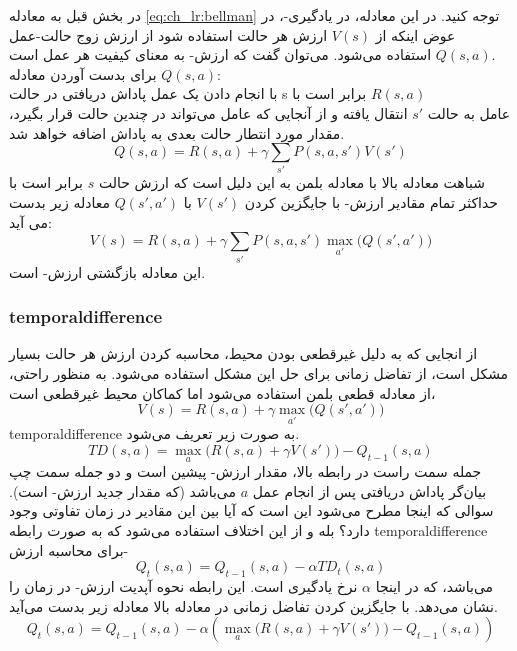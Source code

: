 در بخش قبل به معادله \ref{eq:ch_lr:bellman} توجه کنید. در این معادله، در یادگیری-، در عوض اینکه از $V(s)$ ارزش هر حالت استفاده شود از ارزش زوج حالت-عمل $Q(s,a)$ استفاده می‌شود. می‌توان گفت که ارزش-  به معنای کیفیت هر عمل است. 
\\
برای بدست آوردن معادله $Q(s,a)$:\\
با انجام دادن یک عمل پاداش دریافتی در حالت s برابر است با $R(s,a)$\\
عامل به حالت $s'$ انتقال یافته و از آنجایی که عامل می‌تواند در چندین حالت قرار بگیرد، مقدار مورد انتطار حالت بعدی به پاداش اضافه خواهد شد.
\begin{equation}
	Q(s,a) = R(s,a)+\gamma \sum_{s'}P(s,a,s')V(s')
\end{equation}
شباهت معادله بالا با معادله بلمن به این دلیل است که ارزش حالت $s$ برابر است با حداکثر تمام مقادیر ارزش-
با جایگزین کردن $V(s')$ با $Q(s',a')$ معادله زیر بدست می آید:
\begin{equation}
	V(s) = R(s,a)+\gamma \sum_{s'}P(s,a,s')\max_{a'}\big(Q(s',a')\big)
\end{equation}
این معادله بازگشتی ارزش- است.

\subsubsection{\gls{temporaldifference}}
از انجایی که به دلیل غیرقطعی بودن محیط، محاسبه کردن ارزش هر حالت بسیار مشکل است، از تفاضل زمانی برای حل این مشکل استفاده می‌شود.
به منظور راحتی، از معادله قطعی بلمن استفاده می‌شود اما کماکان محیط غیرقطعی است،
\begin{equation}
	V(s) = R(s,a)+\gamma \max_{a'}\big(Q(s',a')\big)
\end{equation}
\gls{temporaldifference} به صورت زیر تعریف می‌شود.
\begin{equation}
	TD(s, a) = \max_{a}\big(R(s,a)+\gamma V(s')\big) - Q_{t-1}(s,a)
\end{equation}
جمله سمت راست در رابطه بالا، مقدار ارزش- پیشین است و دو جمله سمت چپ بیان‌گر پاداش دریافتی پس از انجام عمل $a$ می‌باشد (که مقدار جدید ارزش- است).
سوالی که اینجا مطرح می‌شود این است که آیا بین این مقادیر در زمان تفاوتی وجود دارد؟ بله و از این اختلاف استفاده می‌شود که به صورت رابطه \gls{temporaldifference} برای محاسبه ارزش-
\begin{equation}
	Q_{t}(s,a) = Q_{t-1}(s,a) - \alpha TD_t(s,a)
\end{equation}
می‌باشد، که در اینجا $\alpha$ نرخ یادگیری است. این رابطه نحوه آپدیت ارزش- در زمان را نشان می‌دهد. با جایگزین کردن تفاضل زمانی در معادله بالا معادله زیر بدست می‌آید.
\begin{equation}
	Q_{t}(s,a) = Q_{t-1}(s,a) - \alpha \left( \max_{a}\big(R(s,a)+\gamma V(s')\big) - Q_{t-1}(s,a) \right) 
\end{equation}


